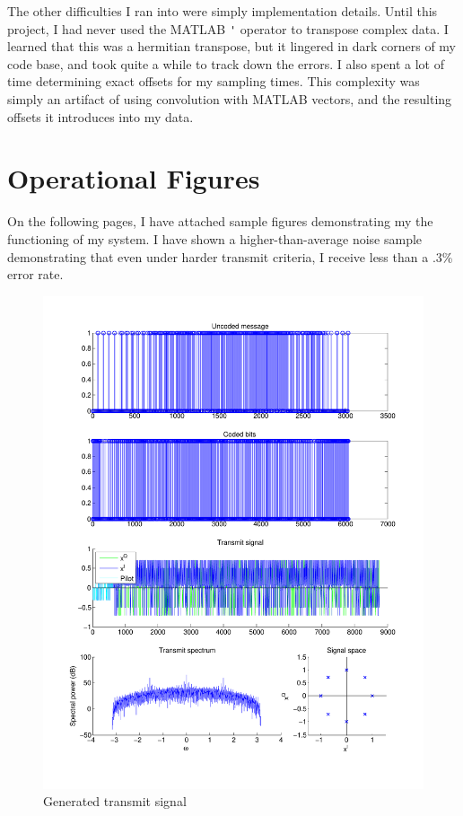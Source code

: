\documentclass[11pt]{scrartcl}
\begin{document}
The other difficulties I ran into were simply implementation details. Until this
project, I had never used the MATLAB \verb|'| operator to transpose complex
data.  I learned that this was a hermitian transpose, but it lingered in dark
corners of my code base, and took quite a while to track down the errors. I also
spent a lot of time determining exact offsets for my sampling times. This
complexity was simply an artifact of using convolution with MATLAB vectors, and
the resulting offsets it introduces into my data.




\section*{Operational Figures}

On the following pages, I have attached sample figures demonstrating my the
functioning of my system. I have shown a higher-than-average noise sample
demonstrating that even under harder transmit criteria, I receive less than
a .3\% error rate.

\begin{figure}
    \centering
    \includegraphics[width=1.0\textwidth]{figures/transmit.pdf}
    \caption{Generated transmit signal}
\end{figure}
\end{document}
